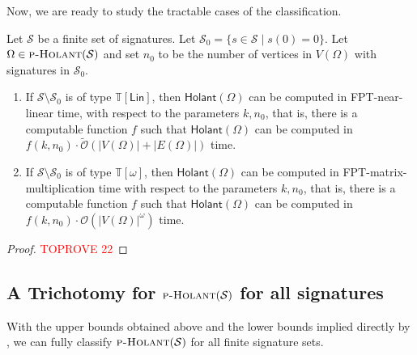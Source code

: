 \documentclass[authorcolumns,numberwithinsect]{no-lipics-v2022}
\newcommand{\holantprob}{\text{\sc{p-Holant}}}
\newcommand{\holant}{\mathsf{Holant}}
\begin{document}
Now, we are ready to study the tractable cases of the classification.

\begin{lemma}\label{lem:reductionRestrictedHolant}
Let $\mathcal{S}$ be a finite set of signatures. Let $\mathcal{S}_0 = \{s \in \mathcal{S} \mid s(0) = 0\}$. Let $\Omega \in \holantprob(\mathcal{S})$ and set $n_0$ to be the number of vertices in $V(\Omega)$ with signatures in $\mathcal{S}_0$.
\begin{enumerate}
\item If $\mathcal{S}\setminus\mathcal{S}_0$ is of type $\mathbb{T}[\mathsf{Lin}]$, then $\holant(\Omega)$ can be computed in FPT-near-linear time, with respect to the parameters $k, n_0$, that is, there is a computable function $f$ such that $\holant(\Omega)$ can be computed in $f(k,n_0)\cdot\tilde{\mathcal{O}}(|V(\Omega)| + |E(\Omega)|)$ time.
\item If $\mathcal{S}\setminus\mathcal{S}_0$ is of type $\mathbb{T}[\omega]$, then $\holant(\Omega)$ can be computed in FPT-matrix-multiplication time with respect to the parameters $k, n_0$, that is, there is a computable function $f$ such that $\holant(\Omega)$ can be computed in $f(k, n_0)\cdot\mathcal{O}(|V(\Omega)|^{\omega})$ time.
\end{enumerate}
\end{lemma}
\begin{proof}\textcolor{red}{TOPROVE 22}\end{proof}

\subsection{A Trichotomy for $\holantprob(\mathcal{S})$ for all signatures}

With the upper bounds obtained above and the lower bounds implied directly by , we can fully classify $\holantprob(\mathcal{S})$ for all finite signature sets.
\end{document}
